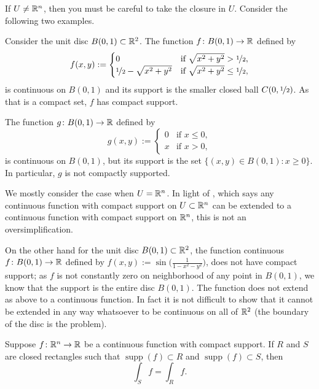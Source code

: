 If $U \not= {\mathbb{R}}^n$, then you must be careful to
take the closure in $U$.  Consider the following
two examples.

\begin{example}
Consider the unit disc $B(0,1) \subset {\mathbb{R}}^2$.
The function $f \colon B(0,1) \to {\mathbb{R}}$ defined by
\begin{equation*}
f(x,y) :=
\begin{cases}
0 & \text{if $\sqrt{x^2+y^2} > \nicefrac{1}{2}$}, \\
\nicefrac{1}{2} - \sqrt{x^2+y^2} & \text{if $\sqrt{x^2+y^2} \leq \nicefrac{1}{2}$},
\end{cases}
\end{equation*}
is continuous on $B(0,1)$ and its support is the smaller closed ball
$C(0,\nicefrac{1}{2})$.  As that is a compact set, $f$ has compact support.

The function $g \colon B(0,1) \to {\mathbb{R}}$ defined by
\begin{equation*}
g(x,y) :=
\begin{cases}
0 & \text{if $x \leq 0$}, \\
x & \text{if $x > 0$},
\end{cases}
\end{equation*}
is continuous on $B(0,1)$, but its support is the set
$\bigl\{ (x,y) \in B(0,1) : x \geq 0 \bigr\}$.  In particular, $g$ is not compactly
supported.
\end{example}

We mostly consider the case when $U={\mathbb{R}}^n$.  In light of
, which says any continuous
function with compact support on $U \subset {\mathbb{R}}^n$ can be extended to a
continuous function with compact support on ${\mathbb{R}}^n$,
this is not an oversimplification.

\begin{example}
On the other hand for the unit disc $B(0,1) \subset {\mathbb{R}}^2$,
the function continuous $f \colon B(0,1) \to {\mathbb{R}}$ defined by $f(x,y) :=
\sin\bigl(\frac{1}{1-x^2-y^2}\bigr)$, does not have compact support; as
$f$ is not constantly zero on neighborhood of any point in $B(0,1)$,
we know that the support is the entire disc $B(0,1)$.  The function 
does not extend as above to a continuous function.  In fact it is not
difficult to show that it cannot be extended in any way whatsoever to be
continuous on all of ${\mathbb{R}}^2$ (the boundary of the disc is the problem).
\end{example}

\begin{prop} \label{mv:prop:rectanglessupp}
Suppose $f \colon {\mathbb{R}}^n \to {\mathbb{R}}$ be a continuous function with compact support.
If $R$ and $S$ are closed rectangles such that
$\operatorname{supp}(f) \subset R$
and
$\operatorname{supp}(f) \subset S$, then
\begin{equation*}
\int_S f = \int_R f .
\end{equation*}
\end{prop}

